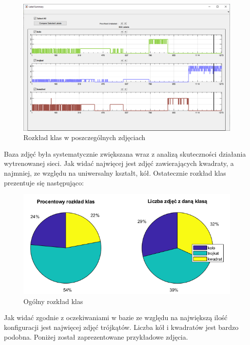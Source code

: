 \begin{figure}[H]
	\centering
	\includegraphics[width=14cm]{pages/uczenie/img/podsumowanieRozkladuEtykiet.png}
	\caption{Rozkład klas w poszczególnych zdjęciach}
\end{figure}
Baza zdjęć była systematycznie zwiększana wraz z analizą skuteczności działania wytrenowanej sieci. 
Jak widać najwięcej jest zdjęć zawierających kwadraty, a najmniej, ze względu na uniwersalny kształt, kół. 
Ostatecznie rozkład klas prezentuje się następująco: 
\begin{figure}[H]
	\centering
	\includegraphics[width=16cm]{pages/uczenie/img/rozkladKlas.png}
	\caption{Ogólny rozkład klas}
\end{figure}
Jak widać zgodnie z oczekiwaniami w bazie ze względu na największą ilość konfiguracji jest najwięcej zdjęć trójkątów. 
Liczba kół i kwadratów jest bardzo podobna. 
Poniżej został zaprezentowane przykładowe zdjęcia. 

